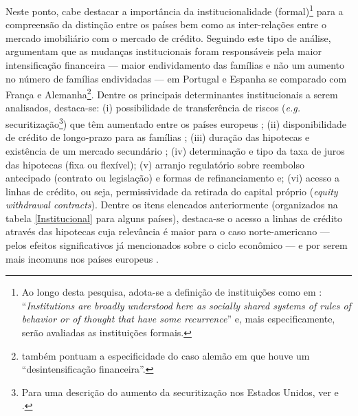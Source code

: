 Neste ponto, cabe destacar a importância da institucionalidade (formal)\footnote{
	Ao longo desta pesquisa, adota-se a definição de instituições como em 	\textcite[p.~85]{dequech_economic_2013}: ``\textit{Institutions are broadly understood here as socially shared systems of rules of behavior or of thought that have some recurrence}'' e, mais especificamente, serão avaliadas as instituições formais.} 
para a compreensão da distinção entre os países bem como as inter-relações entre o mercado imobiliário com o mercado de crédito.  
Seguindo este tipo de análise, \textcite{van_gunten_varieties_2018} argumentam que as mudanças institucionais foram responsáveis pela maior intensificação financeira --- maior endividamento das famílias e não um aumento no número de famílias endividadas --- em Portugal e Espanha se comparado com França e Alemanha\footnote{\textcite[p.~92]{van_gunten_varieties_2018} também pontuam a especificidade do caso alemão em que houve um ``desintensificação financeira''.}. Dentre os principais determinantes institucionais a serem analisados, destaca-se: (i) possibilidade de transferência de riscos (\textit{e.g.} securitização\footnote{Para uma descrição do aumento da securitização nos Estados Unidos, ver \textcite{green_american_2005} e \textcite{cagnin_o_2009}.}) que têm aumentado entre os países europeus \cite{european_central_bank_housing_2010}; (ii) disponibilidade de crédito de longo-prazo para as famílias \cite{schwartz_politics_2009}; (iii) duração das hipotecas e existência de um mercado secundário \cite{green_american_2005}; (iv) determinação  e tipo da taxa de juros das hipotecas (fixa ou flexível); (v) arranjo regulatório sobre reembolso antecipado (contrato ou legislação) e formas de refinanciamento e; (vi) acesso a linhas de crédito, ou seja, permissividade da retirada do capital próprio (\textit{equity withdrawal contracts}). Dentre os itens elencados anteriormente (organizados na tabela \ref{Institucional} para alguns países), destaca-se o acesso a linhas de crédito através das hipotecas cuja relevância é maior para o caso norte-americano --- pelos efeitos significativos já mencionados sobre o ciclo econômico --- e por serem mais incomuns nos países europeus \cite[p.~95]{van_gunten_varieties_2018}.

